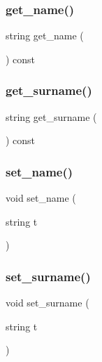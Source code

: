 \subsubsection{\texorpdfstring{get\+\_\+name()}{get\_name()}}
{\footnotesize\ttfamily string get\+\_\+name (\begin{DoxyParamCaption}{ }\end{DoxyParamCaption}) const\hspace{0.3cm}{\ttfamily [inline]}}

\mbox{\label{classPerson_a2dfd43e34424a3c6f40598a6dc0b5f28}} 
\subsubsection{\texorpdfstring{get\+\_\+surname()}{get\_surname()}}
{\footnotesize\ttfamily string get\+\_\+surname (\begin{DoxyParamCaption}{ }\end{DoxyParamCaption}) const\hspace{0.3cm}{\ttfamily [inline]}}

\mbox{\label{classPerson_abe323fe4507bbf06e7677cc049d9fa86}} 
\subsubsection{\texorpdfstring{set\+\_\+name()}{set\_name()}}
{\footnotesize\ttfamily void set\+\_\+name (\begin{DoxyParamCaption}\item[{string}]{t }\end{DoxyParamCaption})\hspace{0.3cm}{\ttfamily [inline]}}

\mbox{\label{classPerson_a7856672997420904aa1650806c6b2063}} 
\subsubsection{\texorpdfstring{set\+\_\+surname()}{set\_surname()}}
{\footnotesize\ttfamily void set\+\_\+surname (\begin{DoxyParamCaption}\item[{string}]{t }\end{DoxyParamCaption})\hspace{0.3cm}{\ttfamily [inline]}}



